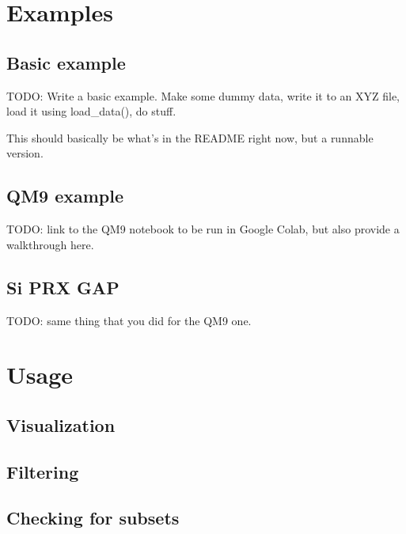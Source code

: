 \documentclass[letterpaper,10pt,english]{sphinxmanual}
\begin{document}
\chapter{Examples}
\label{\detokenize{getting_started:examples}}

\section{Basic example}
\label{\detokenize{basic_example:basic-example}}\label{\detokenize{basic_example::doc}}
\sphinxAtStartPar
TODO: Write a basic example. Make some dummy data, write it to an XYZ file, load
it using load\_data(), do stuff.

\sphinxAtStartPar
This should basically be what’s in the README right now, but a runnable version.


\section{QM9 example}
\label{\detokenize{qm9:qm9-example}}\label{\detokenize{qm9::doc}}
\sphinxAtStartPar
TODO: link to the QM9 notebook to be run in Google Colab, but also provide a
walkthrough here.


\section{Si PRX GAP}
\label{\detokenize{si_prx_gap:si-prx-gap}}\label{\detokenize{si_prx_gap::doc}}
\sphinxAtStartPar
TODO: same thing that you did for the QM9 one.


\chapter{Usage}
\label{\detokenize{usage:usage}}\label{\detokenize{usage::doc}}

\section{Visualization}
\label{\detokenize{usage:visualization}}

\section{Filtering}
\label{\detokenize{usage:filtering}}

\section{Checking for subsets}
\label{\detokenize{usage:checking-for-subsets}}
\end{document}
